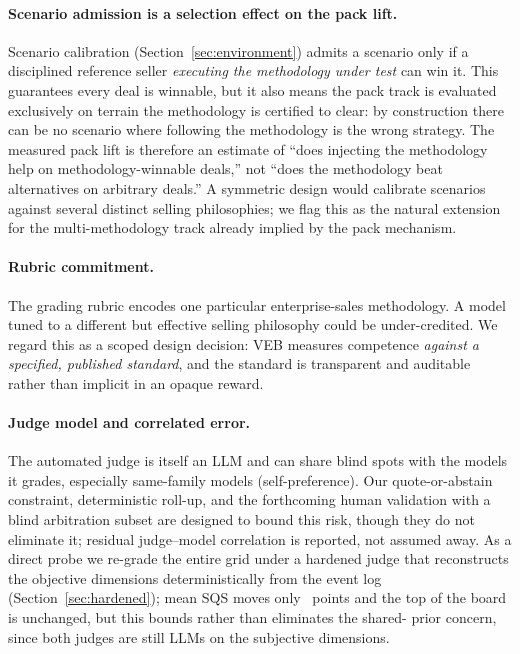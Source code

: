 \paragraph{Scenario admission is a selection effect on the pack lift.} Scenario
calibration (Section~\ref{sec:environment}) admits a scenario only if a
disciplined reference seller \emph{executing the methodology under test} can win
it. This guarantees every deal is winnable, but it also means the pack track is
evaluated exclusively on terrain the methodology is certified to clear: by
construction there can be no scenario where following the methodology is the
wrong strategy. The measured pack lift is therefore an estimate of ``does
injecting the methodology help on methodology-winnable deals,'' not ``does the
methodology beat alternatives on arbitrary deals.'' A symmetric design would
calibrate scenarios against several distinct selling philosophies; we flag this
as the natural extension for the multi-methodology track already implied by the
pack mechanism.

\paragraph{Rubric commitment.} The grading rubric encodes one particular
enterprise-sales methodology. A model tuned to a different but effective selling
philosophy could be under-credited. We regard this as a scoped design decision:
VEB measures competence \emph{against a specified, published standard}, and the
standard is transparent and auditable rather than implicit in an opaque reward.

\paragraph{Judge model and correlated error.} The automated judge is itself an
LLM and can share blind spots with the models it grades, especially same-family
models (self-preference). Our quote-or-abstain constraint, deterministic roll-up,
and the forthcoming human validation with a blind arbitration subset are designed to
bound this risk, though they do
not eliminate it; residual judge--model correlation is reported, not assumed away.
As a direct probe we re-grade the entire grid under a hardened judge that
reconstructs the objective dimensions deterministically from the event log
(Section~\ref{sec:hardened}); mean SQS moves only \resHardenedMeanDelta{}~points and
the top of the board is unchanged, but this bounds rather than eliminates the shared-
prior concern, since both judges are still LLMs on the subjective dimensions.

